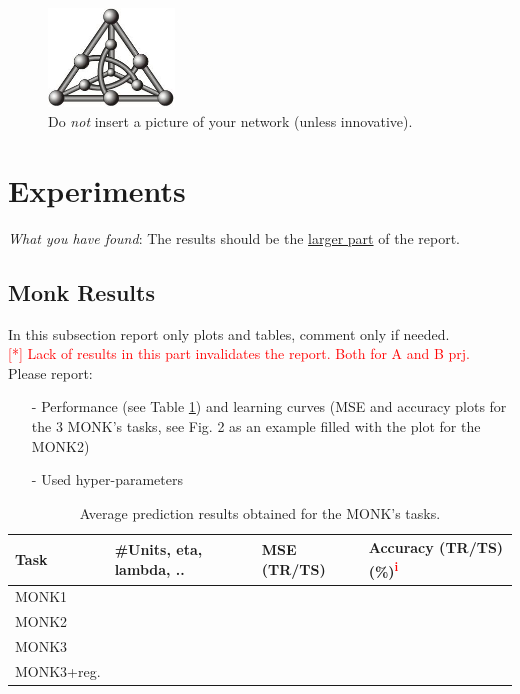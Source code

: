 \documentclass[12pt, letterpaper]{article}  %
\begin{document}
\begin{figure}[h]
\centering
\includegraphics[width=0.3\textwidth]{figure.jpg}
\caption{Do \textit{not} insert a picture of your network (unless innovative).}
\label{fig:myfigure}
\end{figure}

\newpage
\section{Experiments}
\label{sec:experiments}
\textit{What you have found}: The results should be the \underline{larger part} of the report.

\vspace{-0.5cm}\subsection{Monk Results}
In this subsection report only plots and tables, comment only if needed. \\
\textcolor{red}{[*] Lack of results in this part invalidates the report.  Both for A and B prj.} \\
Please report:
\vspace{-0.4cm}\begin{itemize}
    \setlength\itemsep{-0.5em}
    \item[-] Performance (see Table \ref{tab:monk-table}) and learning curves (MSE and accuracy plots for the 3 MONK’s tasks, see Fig. 2 as an example filled with the plot for the MONK2)
    \item[-] Used hyper-parameters
\end{itemize}
\vspace{-0.5cm}\begin{table}[h]
\centering
\small
\begin{tabular}{|l|l|l|l|}
\hline
\textbf{Task} & \textbf{\#Units, eta, lambda, ..} & \textbf{MSE (TR/TS)} & \textbf{Accuracy (TR/TS)(\%)\textsuperscript{\textcolor{red}{i}}} \\ \hline
MONK1         &                                   &                      &                                \\ \hline
MONK2         &                                   &                      &                                \\ \hline
MONK3         &                                   &                      &                                \\ \hline
MONK3+reg. &                                   &                      &                                \\ \hline
\end{tabular}
\caption{Average prediction results obtained for the MONK’s tasks.}
\label{tab:monk-table}
\end{table}
\end{document}
